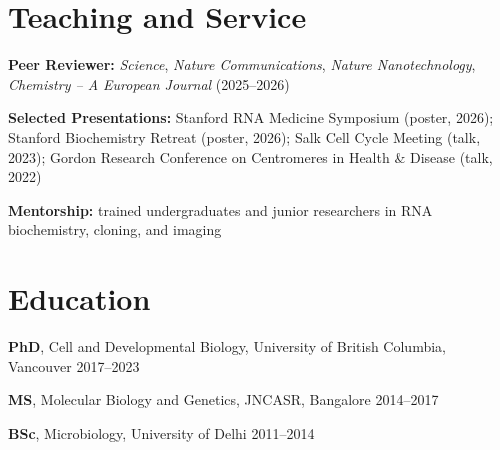 \documentclass[letterpaper,11pt]{article}
\begin{document}
\section{Teaching and Service}
\begin{itemize}[leftmargin=0.15in, label={}]
  \small{
    \item \textbf{Peer Reviewer:} \textit{Science}, \textit{Nature Communications}, \textit{Nature Nanotechnology}, \textit{Chemistry -- A European Journal} (2025--2026)
    \item \textbf{Selected Presentations:} Stanford RNA Medicine Symposium (poster, 2026); Stanford Biochemistry Retreat (poster, 2026); Salk Cell Cycle Meeting (talk, 2023); Gordon Research Conference on Centromeres in Health \& Disease (talk, 2022)
    \item \textbf{Mentorship:} trained undergraduates and junior researchers in RNA biochemistry, cloning, and imaging
  }
\end{itemize}

\section{Education}
\begin{itemize}[leftmargin=0.15in, label={}]
  \small{
    \item \textbf{PhD}, Cell and Developmental Biology, University of British Columbia, Vancouver \hfill 2017--2023

    \item \textbf{MS}, Molecular Biology and Genetics, JNCASR, Bangalore \hfill 2014--2017

    \item \textbf{BSc}, Microbiology, University of Delhi \hfill 2011--2014
  }
\end{itemize}

\end{document}

